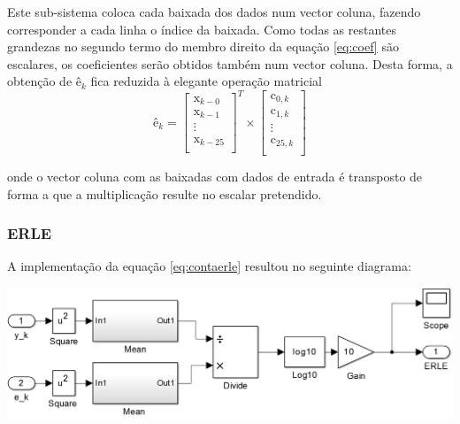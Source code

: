 \documentclass[a4paper,11pt]{report}
\begin{document}
Este sub-sistema coloca cada baixada dos dados num vector coluna, fazendo corresponder a cada linha o índice da baixada. Como todas as restantes grandezas no segundo termo do membro direito da equação \ref{eq:coef} são escalares, os coeficientes serão obtidos também num vector coluna. Desta forma, a obtenção de ê$_k$ fica reduzida à elegante operação matricial
\begin{equation}
ê_k=\begin{bmatrix}
           \textrm{x}_{k-0} \\
           \textrm{x}_{k-1} \\
           \vdots \\           
           \textrm{x}_{k-25} \\
           \end{bmatrix}^T \times
           \begin{bmatrix}
           \textrm{c}_{0,k} \\
           \textrm{c}_{1,k} \\
           \vdots \\           
           \textrm{c}_{25,k} \\
           \end{bmatrix}           
\end{equation}

onde o vector coluna com as baixadas com dados de entrada é transposto de forma a que a multiplicação resulte no escalar pretendido.

\subsubsection{ERLE}

A implementação da equação \ref{eq:contaerle} resultou no seguinte diagrama:

\begin{center}
     \includegraphics[angle=0,width=1\textwidth]{erle.png}
     \label{fig:erle}
     \end{center}
     
\end{document}
